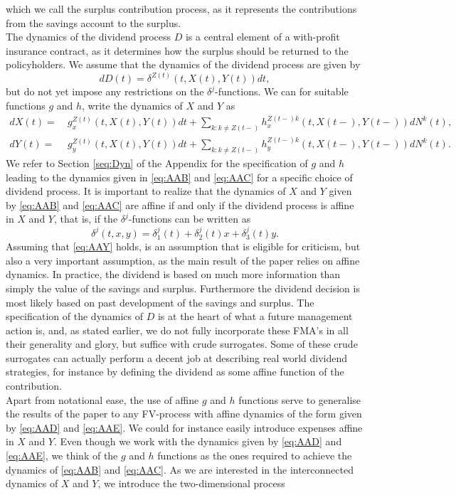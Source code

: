 \documentclass[12pt]{article}
\theoremstyle{my_thm}
\theoremstyle{my_rem}
\begin{document}
which we call the surplus contribution process, as it represents the contributions from the savings account to the surplus.
\\[12pt]
The dynamics of the dividend process $D$ is a central element of a with-profit insurance contract, as it determines how the surplus should be returned to the policyholders. We assume that the dynamics of the dividend process are given by
$$
dD(t)=\delta^{Z(t)}(t,X(t),Y(t)) dt,
$$
but do not yet impose any restrictions on the $\delta^j$-functions. We can for suitable functions $g$ and $h$, write the dynamics of $X$ and $Y$ as
\begin{align}
dX(t)= \ &g^{Z(t)}_{x}(t,X(t),Y(t))dt + \sum_{k:k \neq Z(t-)}  h^{Z(t-)k}_{x}(t,X(t-),Y(t-)) dN^k(t),
\label{eq:AAD}
\\
dY(t)= \ &g^{Z(t)}_{y}(t,X(t),Y(t))dt + \sum_{k:k \neq Z(t-)} h^{Z(t-)k}_{y}(t,X(t-), Y(t-)) dN^k(t)
\label{eq:AAE}.
\end{align}
We refer to Section \ref{seq:Dyn} of the Appendix for the specification of $g$ and $h$ leading to the dynamics given in \eqref{eq:AAB} and \eqref{eq:AAC} for a specific choice of dividend process. It is important to realize that the dynamics of $X$ and $Y$ given by \eqref{eq:AAB} and \eqref{eq:AAC} are affine if and only if the dividend process is affine in $X$ and $Y$, that is, if the $\delta^j$-functions can be written as
\begin{equation}
\delta^j(t,x,y)=\delta_1^j(t)+\delta_2^j(t)x+\delta_3^j(t)y. \label{eq:AAY}
\end{equation}
Assuming that \eqref{eq:AAY} holds, is an assumption that is eligible for criticism, but also a very important assumption, as the main result of the paper relies on affine dynamics. In practice, the dividend is based on much more information than simply the value of the savings and surplus. Furthermore the dividend decision is most likely based on past development of the savings and surplus. The specification of the dynamics of $D$ is at the heart of what a future management action is, and, as stated earlier, we do not fully incorporate these FMA's in all their generality and glory, but suffice with crude surrogates. Some of these crude surrogates can actually perform a decent job at describing real world dividend strategies, for instance by defining the dividend as some affine function of the contribution.
\\[12pt]
Apart from notational ease, the use of affine $g$ and $h$ functions serve to generalise the results of the paper to any FV-process with affine dynamics of the form given by \eqref{eq:AAD} and \eqref{eq:AAE}. We could for instance easily introduce expenses affine in $X$ and $Y$. Even though we work with the dynamics given by \eqref{eq:AAD} and \eqref{eq:AAE}, we think of the $g$ and $h$ functions as the ones required to achieve the dynamics of \eqref{eq:AAB} and \eqref{eq:AAC}. As we are interested in the interconnected dynamics of $X$ and $Y$, we introduce the two-dimensional process 
\end{document}
